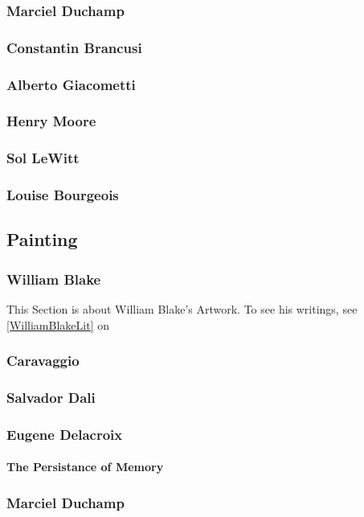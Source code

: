 			\subsubsection{Marciel Duchamp}
			\subsubsection{Constantin Brancusi}
			\subsubsection{Alberto Giacometti}
			\subsubsection{Henry Moore}
			\subsubsection{Sol LeWitt}
			\subsubsection{Louise Bourgeois}
			
		\subsection{Painting}
			\subsubsection{William Blake}
				\label{WilliamBlakeArt} This Section is about William Blake's Artwork.  To see his writings, see \ref{WilliamBlakeLit} on 
			\subsubsection{Caravaggio}
			\subsubsection{Salvador Dali}
			\subsubsection{Eugene Delacroix}
				\paragraph{The Persistance of Memory} 
			\subsubsection{Marciel Duchamp}
